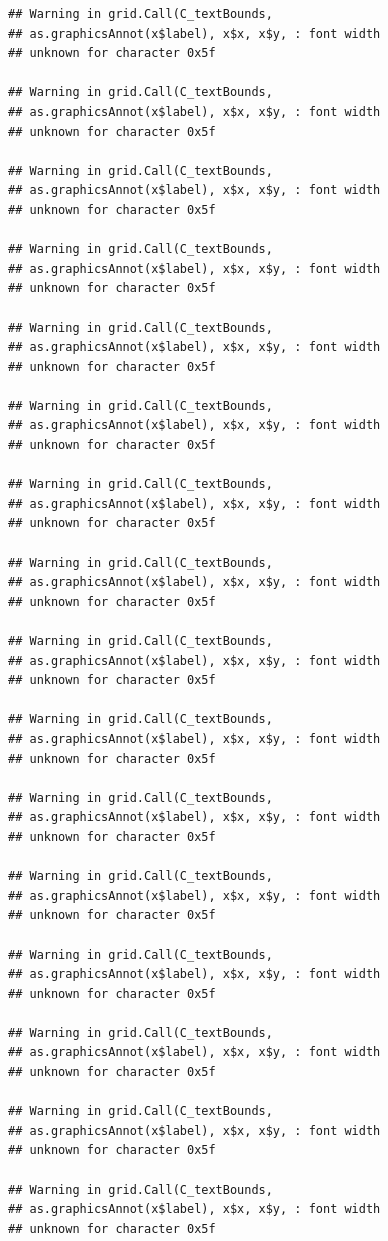 \documentclass[
]{book}
\begin{document}
\begin{verbatim}
## Warning in grid.Call(C_textBounds,
## as.graphicsAnnot(x$label), x$x, x$y, : font width
## unknown for character 0x5f

## Warning in grid.Call(C_textBounds,
## as.graphicsAnnot(x$label), x$x, x$y, : font width
## unknown for character 0x5f

## Warning in grid.Call(C_textBounds,
## as.graphicsAnnot(x$label), x$x, x$y, : font width
## unknown for character 0x5f

## Warning in grid.Call(C_textBounds,
## as.graphicsAnnot(x$label), x$x, x$y, : font width
## unknown for character 0x5f

## Warning in grid.Call(C_textBounds,
## as.graphicsAnnot(x$label), x$x, x$y, : font width
## unknown for character 0x5f

## Warning in grid.Call(C_textBounds,
## as.graphicsAnnot(x$label), x$x, x$y, : font width
## unknown for character 0x5f

## Warning in grid.Call(C_textBounds,
## as.graphicsAnnot(x$label), x$x, x$y, : font width
## unknown for character 0x5f

## Warning in grid.Call(C_textBounds,
## as.graphicsAnnot(x$label), x$x, x$y, : font width
## unknown for character 0x5f

## Warning in grid.Call(C_textBounds,
## as.graphicsAnnot(x$label), x$x, x$y, : font width
## unknown for character 0x5f

## Warning in grid.Call(C_textBounds,
## as.graphicsAnnot(x$label), x$x, x$y, : font width
## unknown for character 0x5f

## Warning in grid.Call(C_textBounds,
## as.graphicsAnnot(x$label), x$x, x$y, : font width
## unknown for character 0x5f

## Warning in grid.Call(C_textBounds,
## as.graphicsAnnot(x$label), x$x, x$y, : font width
## unknown for character 0x5f

## Warning in grid.Call(C_textBounds,
## as.graphicsAnnot(x$label), x$x, x$y, : font width
## unknown for character 0x5f

## Warning in grid.Call(C_textBounds,
## as.graphicsAnnot(x$label), x$x, x$y, : font width
## unknown for character 0x5f

## Warning in grid.Call(C_textBounds,
## as.graphicsAnnot(x$label), x$x, x$y, : font width
## unknown for character 0x5f

## Warning in grid.Call(C_textBounds,
## as.graphicsAnnot(x$label), x$x, x$y, : font width
## unknown for character 0x5f


\end{verbatim}
\end{document}

